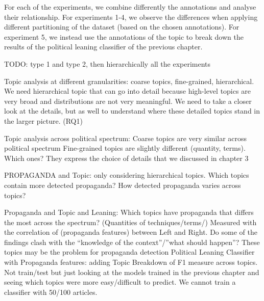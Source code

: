 For each of the experiments, we combine differently the annotations and analyse their relationship. For experiments 1-4, we observe the differences when applying different partitioning of the dataset (based on the chosen annotations). For experiment 5, we instead use the annotations of the topic to break down the results of the political leaning classifier of the previous chapter.

TODO: type 1 and type 2, then hierarchically all the experiments

Topic analysis at different granularities:
coarse topics, fine-grained, hierarchical. We need hierarchical topic that can go into detail because high-level topics are very broad and distributions are not very meaningful. We need to take a closer look at the details, but as well to understand where these detailed topics stand in the larger picture. (RQ1)

Topic analysis across political spectrum:
Coarse topics are very similar across political spectrum
Fine-grained topics are slightly different (quantity, terms). Which ones? They express the choice of details that we discussed in chapter 3

PROPAGANDA and Topic: only considering hierarchical topics.
Which topics contain more detected propaganda?
How detected propaganda varies across topics? 

Propaganda and Topic and Leaning:
Which topics have propaganda that differs the most across the spectrum? (Quantities of techniques/terms/) Measured with the correlation of (propaganda features) between Left and Right.
Do some of the findings clash with the “knowledge of the context”/”what should happen”? These topics may be the problem for propaganda detection
Political Leaning Classifier with Propaganda features: adding Topic
Breakdown of F1 measure across topics. Not train/test but just looking at the models trained in the previous chapter and seeing which topics were more easy/difficult to predict. We cannot train a classifier with 50/100 articles.







